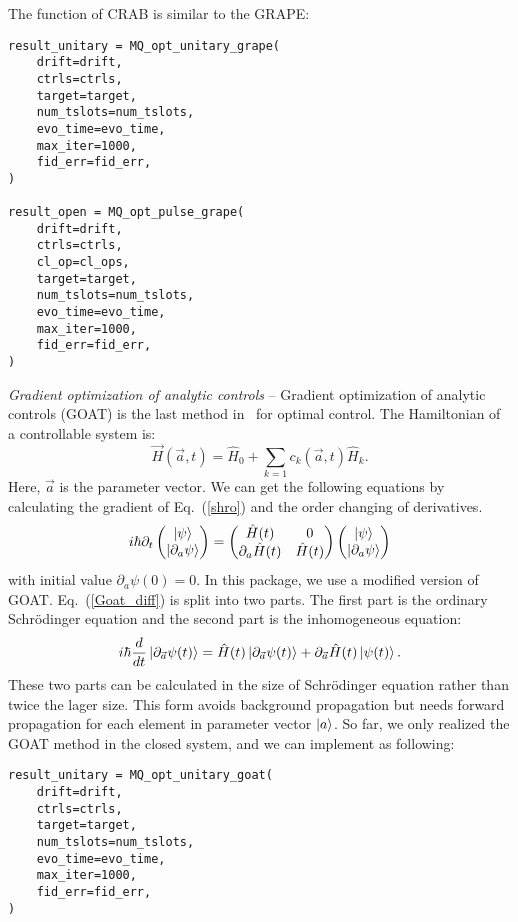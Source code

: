 The function of CRAB is similar to the GRAPE:
\begin{lstlisting}
result_unitary = MQ_opt_unitary_grape(
    drift=drift,
    ctrls=ctrls,
    target=target,
    num_tslots=num_tslots,
    evo_time=evo_time,
    max_iter=1000,
    fid_err=fid_err,
)

result_open = MQ_opt_pulse_grape(
    drift=drift,
    ctrls=ctrls,
    cl_op=cl_ops,
    target=target,
    num_tslots=num_tslots,
    evo_time=evo_time,
    max_iter=1000,
    fid_err=fid_err,
)
\end{lstlisting}

\textit{Gradient optimization of analytic controls} -- Gradient optimization of analytic controls (GOAT) is the last method in \MindQuantum\ for optimal control. The Hamiltonian of a controllable system is:
\begin{equation}
    \vec{H}(\vec{a},t)=\hat{H}_{0}+\sum_{k=1}c_{k}(\vec{a},t)\hat{H}_{k}.
\end{equation}
Here, $\vec{a}$ is the parameter vector. We can get the following equations by calculating the gradient of Eq.~(\ref{shro}) and the order changing of derivatives.
\begin{equation}
    i\hbar\partial_{t}
    \begin{pmatrix}
        \ket{\psi} \\
        \ket{\partial_{a}\psi}
    \end{pmatrix}
    =
    \begin{pmatrix}
        \hat{H}(t)             & 0          \\
        \partial_{a}\hat{H}(t) & \hat{H}(t)
    \end{pmatrix}
    \begin{pmatrix}
        \ket{\psi} \\
        \ket{\partial_{a}\psi}
    \end{pmatrix}
    \label{Goat_diff}
\end{equation}
with initial value $\partial_{a}\psi(0)=0$. In this package, we use a modified version of GOAT. Eq.~(\ref{Goat_diff}) is split into two parts. The first part is the ordinary Schr\"{o}dinger equation and the second part is the inhomogeneous equation:
\begin{equation}
    i\hbar\frac{d}{dt}\ket{\partial_{\vec{a}}\psi(t)}=\hat{H}(t)\ket{\partial_{\vec{a}}\psi(t)}+\partial_{\vec{a}}\hat{H}(t)\ket{\psi(t)}.
\end{equation}
These two parts can be calculated in the size of Schr\"{o}dinger equation rather than twice the lager size. This form avoids background propagation but needs forward propagation for each element in parameter vector $\ket{a}$. So far, we only realized the GOAT method in the closed system, and we can implement as following:
\begin{lstlisting}
result_unitary = MQ_opt_unitary_goat(
    drift=drift,
    ctrls=ctrls,
    target=target,
    num_tslots=num_tslots,
    evo_time=evo_time,
    max_iter=1000,
    fid_err=fid_err,
)
\end{lstlisting}
